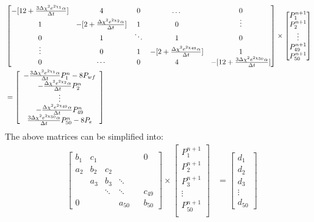 \documentclass[12pt,letterpaper,titlepage]{article}
\begin{document}
 \[ \begin{aligned}
    &\begin{bmatrix} 
     -[12+\frac{3\Delta\chi^2 e^{2\chi_1}\alpha}{\Delta t}] & 4 & 0&\dots & 0 \\ 
     1 & -[2+\frac{\Delta\chi^2 e^{2\chi_2}\alpha}{\Delta t}] & 1 & 0&\vdots \\
    0& 1 & \ddots & 1 & 0 \\
        \vdots&0& 1 & -[2+\frac{\Delta\chi^2 e^{2\chi_{49}}\alpha}{\Delta t}] & 1 \\
       0&\cdots&0&4& -[12+\frac{3\Delta\chi^2 e^{2\chi_{50}}\alpha}{\Delta t}]
 \end{bmatrix} 
  \times \begin{bmatrix} 
      P^{n+1}_1        \\ 
      P^{n+1}_2        \\ 
      \vdots        \\ 
      P^{n+1}_{49}        \\ 
      P^{n+1}_{50}        \\ 
    \end{bmatrix} \\&= \left[\begin{array}{c}  -\frac{3\Delta\chi^2 e^{2\chi_1}\alpha}{\Delta t}P_1^n-8  P_{wf}\\-\frac{\Delta\chi^2e^{2\chi_2}\alpha}{\Delta t} P_2^n\\\vdots\\ -\frac{\Delta\chi^2e^{2\chi_{49}}\alpha}{\Delta t} P_{49}^n\\\-\frac{3\Delta\chi^2 e^{2\chi_{50}}\alpha}{\Delta t}P_{50}^n-8  P_{e}  \end{array}\right]
\end{aligned}  \] 
The above matrices can be simplified into:
 \[ \begin{aligned}
    & \begin{bmatrix} 
     b_1 & c_1 &  & &&0 \\ 
     a_2 & b_2 & c_2 && & \\
     & a_3 & b_3 & \ddots&&  \\
         &&  \ddots & \ddots && c_{49} \\
       0&&&a_{50}&& b_{50}
 \end{bmatrix} 
  \times \begin{bmatrix} 
   P^{n+1}_1        \\ 
      P^{n+1}_2        \\ 
      P^{n+1}_{3}        \\ 
      \vdots        \\ 
      P^{n+1}_{50}        \\ 
    \end{bmatrix} &= \left[\begin{array}{l}  d_1\\d_2\\d_3\\\vdots\\d_{50}  \end{array}\right]
\end{aligned}  \]
\end{document}
